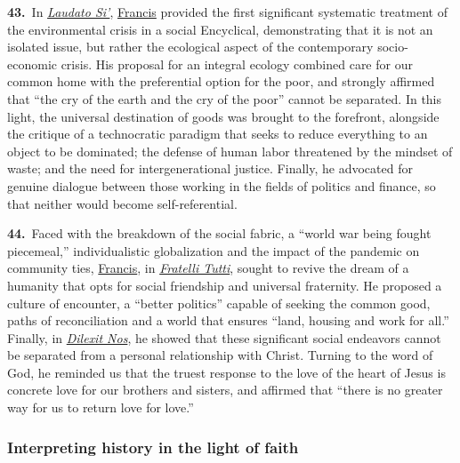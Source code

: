 \documentclass{article}
\begin{document}
\textbf{43.}\ In \href{https://www.vatican.va/content/francesco/en/encyclicals/documents/papa-francesco_20150524_enciclica-laudato-si.html}{\emph{Laudato Si'}}, \href{https://www.vatican.va/content/francesco/en.html}{Francis} provided the first significant systematic treatment of the environmental crisis in a social Encyclical, demonstrating that it is not an isolated issue, but rather the ecological aspect of the contemporary socio-economic crisis. His proposal for an integral ecology combined care for our common home with the preferential option for the poor, and strongly affirmed that ``the cry of the earth and the cry of the poor''\cite{n48} cannot be separated. In this light, the universal destination of goods was brought to the forefront, alongside the critique of a technocratic paradigm that seeks to reduce everything to an object to be dominated; the defense of human labor threatened by the mindset of waste; and the need for intergenerational justice. Finally, he advocated for genuine dialogue between those working in the fields of politics and finance, so that neither would become self-referential.

\textbf{44.}\ Faced with the breakdown of the social fabric, a ``world war being fought piecemeal,'' individualistic globalization and the impact of the pandemic on community ties, \href{https://www.vatican.va/content/francesco/en.html}{Francis}, in \href{https://www.vatican.va/content/francesco/en/encyclicals/documents/papa-francesco_20201003_enciclica-fratelli-tutti.html}{\emph{Fratelli Tutti}}, sought to revive the dream of a humanity that opts for social friendship and universal fraternity. He proposed a culture of encounter, a ``better politics'' capable of seeking the common good, paths of reconciliation and a world that ensures ``land, housing and work for all.''\cite{n49} Finally, in \href{https://www.vatican.va/content/francesco/en/encyclicals/documents/20241024-enciclica-dilexit-nos.html}{\emph{Dilexit Nos}}, he showed that these significant social endeavors cannot be separated from a personal relationship with Christ. Turning to the word of God, he reminded us that the truest response to the love of the heart of Jesus is concrete love for our brothers and sisters, and affirmed that ``there is no greater way for us to return love for love.''\cite{n50}

\subsubsection{Interpreting history in the light of faith}
\end{document}
